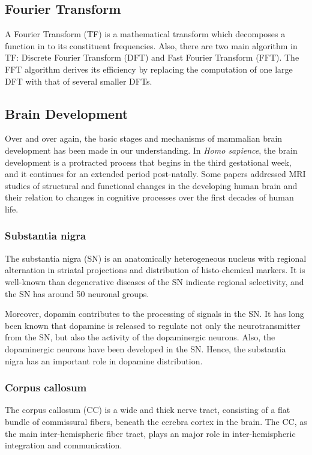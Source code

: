 \documentclass[10pt, a4paper]{article}
\begin{document}
		\subsection{Fourier Transform}
			A Fourier Transform (TF) is a mathematical transform which decomposes a function in to its constituent frequencies. Also, there are two main algorithm in TF: Discrete Fourier Transform (DFT) and Fast Fourier Transform (FFT). The FFT algorithm derives its efficiency by replacing the computation of one large DFT with that of several smaller DFTs. \cite{ref:FFT1}
			
		\subsection{Brain Development}
			Over and over again, the basic stages and mechanisms of mammalian brain development has been made in our understanding. In \textit{Homo sapience}, the brain development is a protracted process that begins in the third gestational week, and it continues for an extended period post-natally. \cite{ref:brain1} Some papers addressed MRI studies of structural and functional changes in the developing human brain and their relation to changes in cognitive processes over the first decades of human life. \cite{ref:brain2}
			
			\subsubsection{Substantia nigra}
				The substantia nigra (SN) is an anatomically heterogeneous nucleus with regional alternation in striatal projections and distribution of histo-chemical markers. \cite{ref:nigra1} It is well-known than degenerative diseases of the SN indicate regional selectivity, and the SN has around 50 neuronal groups. 
				
				Moreover, dopamin contributes to the processing of signals in the SN. \cite{ref:nigra3} It has long been known that dopamine is released to regulate not only the neurotransmitter from the SN, but also the activity of the dopaminergic neurons. \cite{ref:nigra2} Also, the dopaminergic neurons have been developed in the SN. \cite{ref:nigra4} Hence, the substantia nigra has an important role in dopamine distribution. 
			
			\subsubsection{Corpus callosum}
				The corpus callosum (CC) is a wide and thick nerve tract, consisting of a flat bundle of commissural fibers, beneath the cerebra cortex in the brain. The CC, as the main inter-hemispheric fiber tract, plays an major role in inter-hemispheric integration and communication. \cite{ref:cc1} 
				
\end{document}
